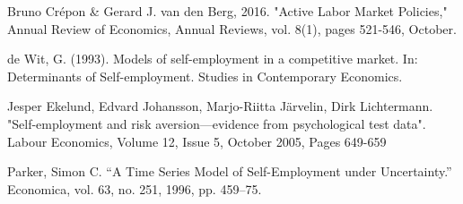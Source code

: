 \documentclass{article}
\begin{document}





\begin{thebibliography}{9}

Bruno Crépon \& Gerard J. van den Berg, 2016. "Active Labor Market Policies," Annual Review of Economics, Annual Reviews, vol. 8(1), pages 521-546, October.

de Wit, G. (1993). Models of self-employment in a competitive market. In: Determinants of Self-employment. Studies in Contemporary Economics.

Jesper Ekelund, Edvard Johansson, Marjo-Riitta Järvelin, Dirk Lichtermann. "Self-employment and risk aversion—evidence from psychological test data". Labour Economics, Volume 12, Issue 5, October 2005, Pages 649-659

Parker, Simon C. “A Time Series Model of Self-Employment under Uncertainty.” Economica, vol. 63, no. 251, 1996, pp. 459–75.

\end{thebibliography}
\end{document}
